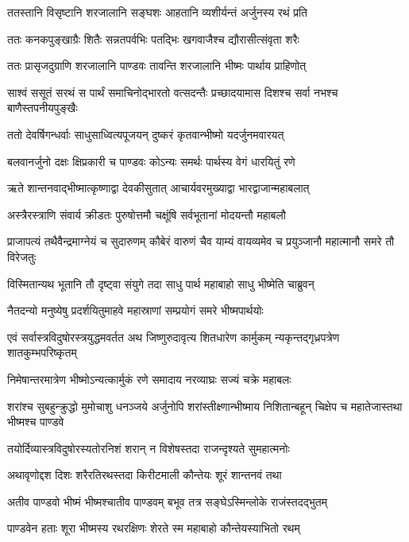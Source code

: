 \twolineshloka
{ततस्तानि विसृष्टानि शरजालानि सङ्घशः}
{आहतानि व्यशीर्यन्तं अर्जुनस्य रथं प्रति}


\twolineshloka
{ततः कनकपुङ्खाग्रैः शितैः सन्नतपर्वभिः}
{पतद्भिः खगवाजैश्च द्यौरासीत्संवृता शरैः}


\twolineshloka
{ततः प्रासृजदुग्राणि शरजालानि पाण्डवः}
{तावन्ति शरजालानि भीष्मः पार्थाय प्राहिणोत्}


\twolineshloka
{साश्वं ससूतं सरथं स पार्थं समाचिनोद्भारतो वत्सदन्तैः}
{प्रच्छादयामास दिशश्च सर्वा नभश्च बाणैस्तपनीयपुङ्खैः}


\twolineshloka
{ततो देवर्षिगन्धर्वाः साधुसाध्वित्यपूजयन्}
{दुष्करं कृतवान्भीष्मो यदर्जुनमवारयत्}


\twolineshloka
{बलवानर्जुनो दक्षः क्षिप्रकारी च पाण्डवः}
{कोऽन्यः समर्थः पार्थस्य वेगं धारयितुं रणे}


\twolineshloka
{ऋते शान्तनवाद्भीष्मात्कृष्णाद्वा देवकीसुतात्}
{आचार्यवरमुख्याद्वा भारद्वाजान्महाबलात्}


\twolineshloka
{अस्त्रैरस्त्राणि संवार्य क्रीडतः पुरुषोत्तमौ}
{चक्षूंषि सर्वभूतानां मोदयन्तौ महाबलौ}


\threelineshloka
{प्राजापत्यं तथैवैन्द्रमाग्नेयं च सुदारुणम्}
{कौबेरं वारुणं चैव याम्यं वायव्यमेव च}
{प्रयुञ्जानौ महात्मानौ समरे तौ विरेजतुः}


\twolineshloka
{विस्मितान्यथ भूतानि तौ दृष्ट्वा संयुगे तदा}
{साधु पार्थ महाबाहो साधु भीष्मेति चाब्रुवन्}


\twolineshloka
{नैतदन्यो मनुष्येषु प्रदर्शयितुमाहवे}
{महास्राणां सम्प्रयोगं समरे भीष्मपार्थयोः}


\onelineshloka
{एवं सर्वास्त्रविदुषोरस्त्रयुद्धमवर्तत}
\twolineshloka
{अथ जिष्णुरुदावृत्य शितधारेण कार्मुकम्}
{न्यकृन्तद्गृध्रपत्रेण शातकुम्भपरिष्कृतम्}


\twolineshloka
{निमेषान्तरमात्रेण भीष्मोऽन्यत्कार्मुकं रणे}
{समादाय नरव्याघ्रः सज्यं चक्रे महाबलः}


\threelineshloka
{शरांश्च सुबहुन्क्रुद्धो मुमोचाशु धनञ्जये}
{अर्जुनोपि शरांस्तीक्ष्णान्भीष्माय निशितान्बहून्}
{चिक्षेप च महातेजास्तथा भीष्मश्च पाण्डवे}


\twolineshloka
{तयोर्दिव्यास्त्रविदुषोरस्यतोरनिशं शरान्}
{न विशेषस्तदा राजन्दृश्यते सुमहात्मनोः}


\twolineshloka
{अथावृणोद्दश दिशः शरैरतिरथस्तदा}
{किरीटमाली कौन्तेयः शूरं शान्तनवं तथा}


\twolineshloka
{अतीव पाण्डवो भीष्मं भीष्मश्चातीव पाण्डवम्}
{बभूव तत्र सङ्घेऽस्मिन्लोके राजंस्तदद्भुतम्}


\twolineshloka
{पाण्डवेन हताः शूरा भीष्मस्य रथरक्षिणः}
{शेरते स्म महाबाहो कौन्तेयस्याभितो रथम्}


